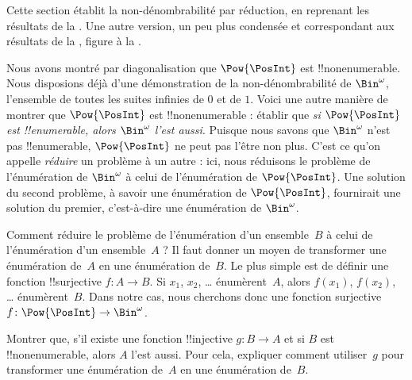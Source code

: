 \documentclass[../../../include/open-logic-section]{subfiles}
\begin{document}


\begin{editorial}
  Cette section établit la non-dénombrabilité par réduction, en reprenant
  les résultats de la . Une autre version, un peu plus
  condensée et correspondant aux résultats de la ,
  figure à la .
\end{editorial}

Nous avons montré par diagonalisation que $\Pow{\PosInt}$ est
!!{nonenumerable}. Nous disposions déjà d'une démonstration de la
non-dénombrabilité de $\Bin^\omega$, l'ensemble de toutes les suites
infinies de $0$ et de $1$. Voici une autre manière de montrer que
$\Pow{\PosInt}$ est !!{nonenumerable} : établir que \emph{si
$\Pow{\PosInt}$ est !!{enumerable}, alors $\Bin^\omega$ l'est aussi}.
Puisque nous savons que $\Bin^\omega$ n'est pas !!{enumerable},
$\Pow{\PosInt}$ ne peut pas l'être non plus. C'est ce qu'on appelle
\emph{réduire} un problème à un autre : ici, nous réduisons le problème
de l'énumération de $\Bin^\omega$ à celui de l'énumération de
$\Pow{\PosInt}$. Une solution du second problème, à savoir une
énumération de $\Pow{\PosInt}$, fournirait une solution du premier,
c'est-à-dire une énumération de $\Bin^\omega$.

Comment réduire le problème de l'énumération d'un ensemble~$B$ à celui
de l'énumération d'un ensemble~$A$ ? Il faut donner un moyen de
transformer une énumération de~$A$ en une énumération de~$B$. Le plus
simple est de définir une fonction !!{surjective} $f\colon A \to B$.
Si $x_1$, $x_2$, \dots{} énumèrent~$A$, alors $f(x_1)$, $f(x_2)$,
\dots{} énumèrent~$B$. Dans notre cas, nous cherchons donc une fonction
surjective $f\colon \Pow{\PosInt} \to \Bin^\omega$.

\begin{prob}
Montrer que, s'il existe une fonction !!{injective} $g\colon B \to A$
et si $B$ est !!{nonenumerable}, alors $A$ l'est aussi. Pour cela,
expliquer comment utiliser~$g$ pour transformer une énumération de~$A$
en une énumération de~$B$.
\end{prob}
\end{document}
